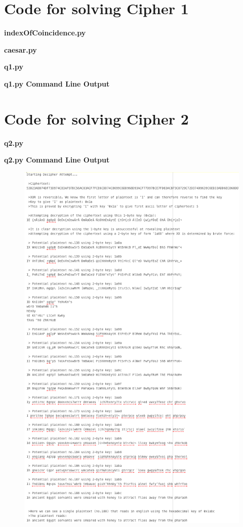 \documentclass[a4paper,11pt]{article}
\begin{document}
\pagebreak
{}
\begin{appendices}

	\section{Code for solving Cipher 1} \label{Code for solving Cipher 1}
		{\bfseries{indexOfCoincidence.py}}
		
		\newpage
		
		{\bfseries{caesar.py}}
		
		\newpage
		
		{\bfseries{q1.py}}
		
		\newpage
		
		{\bfseries{q1.py Command Line Output}}
		

	\newpage	
	\section{Code for solving Cipher 2} \label{Code for solving Cipher 2}
		{\bfseries{q2.py}}
		
		\newpage

		{\bfseries{q2.py Command Line Output}}
		\begin{figure}[h]
			\centering
			\includegraphics[width = 12cm]{img/xorLog}
		\end{figure}


\end{appendices}
\end{document}
